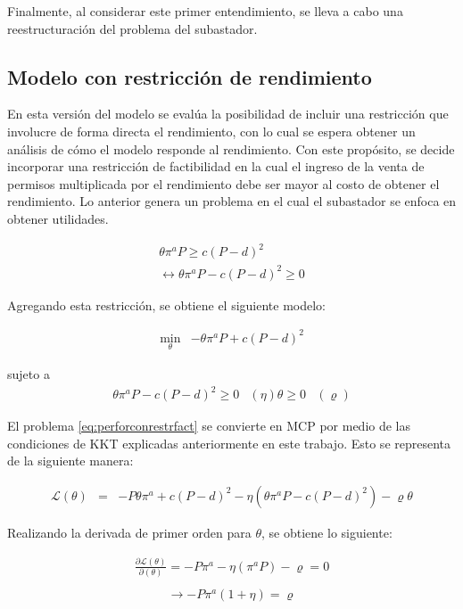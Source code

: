 Finalmente, al considerar este primer entendimiento, se lleva a cabo una reestructuración del problema del subastador.


\subsection{Modelo con restricción de rendimiento}\label{modelo:conrendimiento}

En esta versión del modelo se evalúa la posibilidad de incluir una restricción que involucre de forma directa el rendimiento, con lo cual se espera obtener un análisis de cómo el modelo responde al rendimiento. Con este propósito, se decide incorporar una restricción de factibilidad en la cual el ingreso de la venta de permisos multiplicada por el rendimiento debe ser mayor al costo de obtener el rendimiento. Lo anterior genera un problema en el cual el subastador se enfoca en obtener utilidades.

\begin{align}
\theta \pi^a P  \geq  c(P-d)^2 \\
\leftrightarrow \theta \pi^a P - c(P-d)^2 \geq 0  
\end{align}

\vspace{2.5mm}

Agregando esta restricción, se obtiene el siguiente modelo: 

\begin{eqnarray}
\min_{\theta} & -\theta \pi^aP + c(P-d)^2\label{eq:perforconrestrfact}
\end{eqnarray}

sujeto a
\begin{eqnarray}
    \theta \pi^a P - c(P-d)^2 \geq 0 & (\eta)  \label{perforconrestrfact:r1}
    \theta \geq 0 & (\varrho)
\end{eqnarray}

El problema \ref{eq:perforconrestrfact} se convierte en MCP por medio de las condiciones de KKT explicadas anteriormente en este trabajo. Esto se representa de la siguiente manera: 

\begin{eqnarray}
\mathcal{L}(\theta)&=&-P\theta\pi^a+c(P-d)^2 -\eta(\theta \pi^a P - c(P-d)^2)- \varrho\theta 
\end{eqnarray}


Realizando la derivada de primer orden para $\theta$, se obtiene lo siguiente:

\begin{equation}
\begin{array}{rrclcl}
    \frac{\partial\mathcal{L}(\theta)}{\partial (\theta)}=-P\pi^a-\eta(\pi^a P) -\varrho=0 \label{lag30}\\
\end{array}
\end{equation}
\begin{equation}
\begin{array}{rrclcl}
    \rightarrow -P\pi^a(1+\eta)=\varrho \label{lag31}\\
\end{array}
\end{equation}

